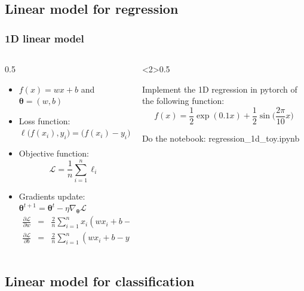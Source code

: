\documentclass[pressentation,10pt,aspectratio=169,xcolor=table, colorlinks=true]{beamer}
\begin{document}
\subsection{Linear model for regression}

\begin{frame}[fragile]
  \frametitle{1D linear model}
  \begin{columns}
    \begin{column}{0.5\linewidth}
      \begin{itemize}
      \item  \(f(x) = wx +b\)  and \(\boldsymbol{\theta} = (w,b)\)     
      \item Loss function: \(\ell \big(f(x_i),y_i\big) = \big(f(x_i) - y_i\big)^2\)
      \item Objective function: \[\mathcal{L} = \frac{1}{n} \sum_{i=1}^n \ell_i\]
      \item Gradients update: \(\boldsymbol{\theta}^{t+1} = \boldsymbol{\theta}^{t} - \eta\nabla_{\boldsymbol{\theta}}\mathcal{L}\)
        \begin{eqnarray*}
          \frac{\partial \mathcal{L}}{\partial w} & = & \frac{2}{n}\sum_{i=1}^n x_i(wx_i +b-y_i)\label{eq:lin:grad:w}\\
          \frac{\partial \mathcal{L}}{\partial b} & = & \frac{2}{n}\sum_{i=1}^n (wx_i +b-y_i)\label{eq:lin:grad:b}
        \end{eqnarray*}
      \end{itemize}
    \end{column}
    \begin{column}<2>{0.5\linewidth}
      \begin{work}
        Implement the 1D regression in pytorch of the following function:
        \[f(x)=\frac{1}{2}\exp(0.1x) + \frac{1}{2}\sin\big(\frac{2\pi}{10}x\big)\]

        Do the notebook: \textcolor{ornage}{regression_1d_toy.ipynb}
      \end{work}
    \end{column}
  \end{columns}
\end{frame}

\subsection{Linear model for classification}

\end{document}
